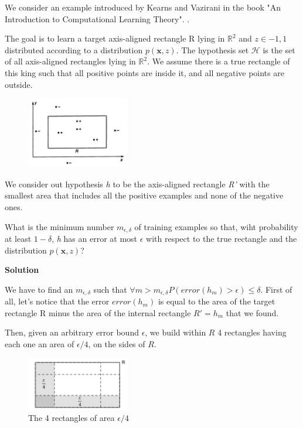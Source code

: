 \begin{exampleblock}
    We consider an example introduced by Kearns and Vazirani in the book "An Introduction to Computational Learning Theory". \cite{kearns1994introduction}.

    The goal is to learn a target axis-aligned rectangle R lying in $\mathbb{R}^2$ and $z \in {-1,1}$ distributed according to a distribution $p(\textbf{x}, z)$. The hypothesis set $\mathcal{H}$ is the set of all axis-aligned rectangles lying in $\mathbb{R}^2$. We assume there is a true rectangle of this king such that all positive points are inside it, and all negative points are outside. 
    \begin{figure}[H]
        \centering 
        \includegraphics[width=0.4\textwidth]{assets/fig8.png}
    \end{figure}


We consider out hypothesis \textit{h} to be the axis-aligned rectangle \textit{R'} with the smallest area that includes all the positive examples and none of the negative ones.

What is the minimum number $m_{\epsilon, \delta}$ of training examples so that, wiht probability at least $1-\delta$, \textit{h} has an error at most $\epsilon$ with respect to the true rectangle and the distribution $p(\textbf{x}, z)$?

\textbf{Solution}

We have to find an $m_{\epsilon, \delta}$ such that $\forall m > m_{\epsilon, \delta} P(error(h_m) > \epsilon) \leq \delta$. First of all, let's notice that the error $error(h_m)$ is equal to the area of the target rectangle R minus the area of the internal rectangle $R' = h_m$ that we found. 

Then, given an arbitrary error bound $\epsilon$, we build within $R$ 4 rectangles having each one an area of $\epsilon/4$, on the sides of $R$.

\begin{figure}[H]
    \centering
    \includegraphics[width=0.4\textwidth]{assets/fig9.png}
    \caption{The 4 rectangles of area $\epsilon/4$}
    \label{fig:fig9}
\end{figure}


\end{exampleblock}
